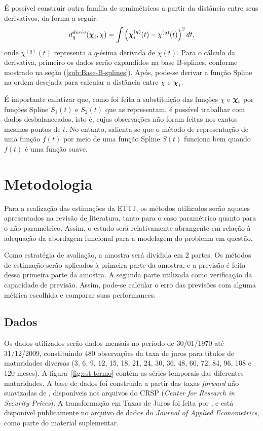 \documentclass[
	12pt,				%
	openright,			%
	oneside,			%
	a4paper,			%
	english,			%
	brazil				%
	]{dissertacao-ufrgs-abntex2}
\begin{document}
É possível construir outra família de semimétricas a partir da distância
entre seus derivativos, da forma a seguir:
\begin{equation}
d_{q}^{deriv}(\boldsymbol{\chi}_{i},\chi)=\int\left(\boldsymbol{\chi}_{i}^{(q)}(t)-\chi^{(q)}(t)\right)^{2}dt,
\end{equation}
onde $\chi^{(q)}(t)$ representa a $q$-ésima derivada de $\chi(t)$.
Para o cálculo da derivativa, primeiro os dados serão expandidos na
base B-splines, conforme mostrado na seção (\ref{sub:Base-B-splines}).
Após, pode-se derivar a função Spline na ordem desejada para calcular
a distância entre $\chi$ e $\boldsymbol{\chi}_{i}$.

É importante enfatizar que, como foi feita a substituição das funções
$\chi$ e $\boldsymbol{\chi}_{i}$ por funções Spline $S_{1}(t)$ e $S_{2}(t)$
que as representam, é possível trabalhar com dados desbalanceados,
isto é, cujas observações não foram feitas nos exatos mesmos pontos
de $t$. No entanto, salienta-se que o método de representação de
uma função $f(t)$ por meio de uma função Spline $S(t)$ funciona
bem quando $f(t)$ é uma função suave.



\chapter{Metodologia} \label{ch:metodologia}

Para a realização das estimações da ETTJ, os métodos utilizados serão aqueles apresentados na revisão de literatura, tanto para o caso paramétrico quanto para o não-paramétrico. Assim, o estudo será relativamente abrangente em relação à adequação da abordagem funcional para a modelagem do problema em questão.

Como estratégia de avaliação, a amostra será dividida em 2 partes. Os métodos de estimação serão aplicados à primeira parte da amostra, e a previsão é feita dessa primeira parte da amostra. A segunda parte utilizada como verificação da capacidade de previsão. Assim, pode-se calcular o erro das previsões com alguma métrica escolhida e comparar suas performances. 

\section{Dados}

Os dados utilizados serão dados mensais no período de 30/01/1970 até 31/12/2009, constituindo 480 observações da taxa de juros para títulos de maturidades diversas (3, 6, 9, 12, 15, 18, 21, 24, 30, 36, 48, 60, 72, 84, 96, 108 e 120 meses). A figura~\ref{fig:est-termo} contém as séries temporais das diferentes maturidades. 
A base de dados foi construída a partir das taxas \emph{forward} não suavizadas de , disponíveis nos arquivos do CRSP (\emph{Center for Research in Security Prices}). A transformação em Taxas de Juros foi feita por , e está disponível publicamente no arquivo de dados do \emph{Journal of Applied Econometrics}, como parte do material suplementar.
\end{document}
